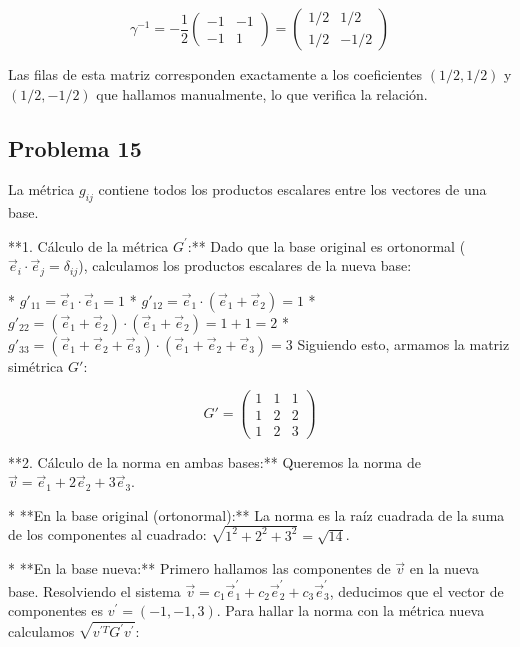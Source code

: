 \documentclass[11pt,spanish]{article}
\begin{document}
$$\gamma^{-1} = -\frac{1}{2}\begin{pmatrix} -1 & -1 \\ -1 & 1 \end{pmatrix} = \begin{pmatrix} 1/2 & 1/2 \\ 1/2 & -1/2 \end{pmatrix}$$

Las filas de esta matriz corresponden exactamente a los coeficientes $(1/2, 1/2)$ y $(1/2, -1/2)$ que hallamos manualmente, lo que verifica la relación.



\subsection*{Problema 15}

La métrica $g_{ij}$ contiene todos los productos escalares entre los vectores de una base.

**1. Cálculo de la métrica $G^{\prime}$:**
Dado que la base original es ortonormal ($\vec{e}_{i}\cdot\vec{e}_{j}=\delta_{ij}$), calculamos los productos escalares de la nueva base:

* $g'_{11} = \vec{e}_{1}\cdot\vec{e}_{1} = 1$
* $g'_{12} = \vec{e}_{1}\cdot(\vec{e}_{1}+\vec{e}_{2}) = 1$
* $g'_{22} = (\vec{e}_{1}+\vec{e}_{2})\cdot(\vec{e}_{1}+\vec{e}_{2}) = 1+1 = 2$
* $g'_{33} = (\vec{e}_{1}+\vec{e}_{2}+\vec{e}_{3})\cdot(\vec{e}_{1}+\vec{e}_{2}+\vec{e}_{3}) = 3$
Siguiendo esto, armamos la matriz simétrica $G'$:



$$G' = \begin{pmatrix} 1 & 1 & 1 \\ 1 & 2 & 2 \\ 1 & 2 & 3 \end{pmatrix}$$



**2. Cálculo de la norma en ambas bases:**
Queremos la norma de $\vec{v} = \vec{e}_{1}+2\vec{e}_{2}+3\vec{e}_{3}$.

* 
**En la base original (ortonormal):** La norma es la raíz cuadrada de la suma de los componentes al cuadrado: $\sqrt{1^2 + 2^2 + 3^2} = \sqrt{14}$.


* **En la base nueva:** Primero hallamos las componentes de $\vec{v}$ en la nueva base. Resolviendo el sistema $\vec{v} = c_1\vec{e}_{1}^{\prime} + c_2\vec{e}_{2}^{\prime} + c_3\vec{e}_{3}^{\prime}$, deducimos que el vector de componentes es $v^{\prime} = (-1, -1, 3)$.
Para hallar la norma con la métrica nueva calculamos $\sqrt{v^{\prime T} G^{\prime} v^{\prime}}$:
\end{document}
